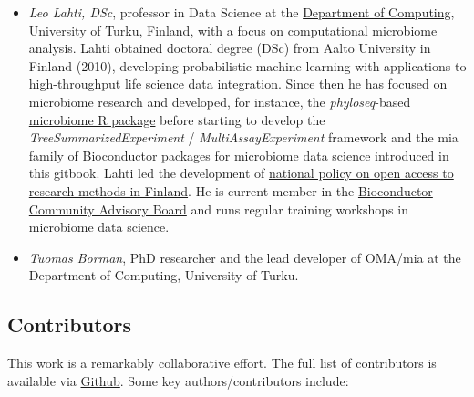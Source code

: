 \documentclass[
]{book}
\begin{document}
\begin{itemize}
\item
  \emph{Leo Lahti, DSc}, professor in Data Science at the \href{https://datascience.utu.fi/}{Department of
  Computing, University of Turku,
  Finland}, with a focus on
  computational microbiome analysis. Lahti obtained doctoral degree
  (DSc) from Aalto University in Finland (2010), developing
  probabilistic machine learning with applications to high-throughput
  life science data integration. Since then he has focused on
  microbiome research and developed, for instance, the
  \emph{phyloseq}-based \href{https://bioconductor.org/packages/release/bioc/html/microbiome.html}{microbiome R
  package}
  before starting to develop the \emph{TreeSummarizedExperiment} /
  \emph{MultiAssayExperiment} framework and the mia family of Bioconductor
  packages for microbiome data science introduced in this
  gitbook. Lahti led the development of \href{https://avointiede.fi/en/policies-materials/policies-open-science-and-research-finland/policy-open-research-data-and-methods}{national policy on open
  access to research methods in
  Finland}.
  He is current member in the \href{https://bioconductor.org/about/community-advisory-board/}{Bioconductor Community Advisory
  Board}
  and runs regular training workshops in microbiome data science.
\item
  \emph{Tuomas Borman}, PhD researcher and the lead developer of OMA/mia at
  the Department of Computing, University of Turku.
\end{itemize}

\hypertarget{contributors}{%
\subsection*{Contributors}\label{contributors}}

This work is a remarkably collaborative effort. The full list of
contributors is available via
\href{https://github.com/microbiome/OMA/graphs/contributors}{Github}. Some
key authors/contributors include:
\end{document}
